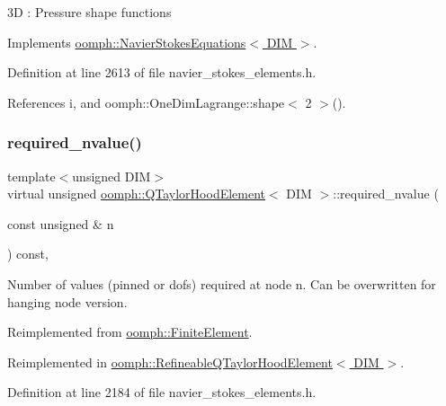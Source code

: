 3D \+: Pressure shape functions 

Implements \hyperlink{classoomph_1_1NavierStokesEquations_a487030303b71da299aed3d4639a022ab}{oomph\+::\+Navier\+Stokes\+Equations$<$ D\+I\+M $>$}.



Definition at line 2613 of file navier\+\_\+stokes\+\_\+elements.\+h.



References i, and oomph\+::\+One\+Dim\+Lagrange\+::shape$<$ 2 $>$().

\mbox{\label{classoomph_1_1QTaylorHoodElement_a7993924abd5095ebaa776ee0e080e600}} 
\subsubsection{\texorpdfstring{required\+\_\+nvalue()}{required\_nvalue()}}
{\footnotesize\ttfamily template$<$unsigned D\+IM$>$ \\
virtual unsigned \hyperlink{classoomph_1_1QTaylorHoodElement}{oomph\+::\+Q\+Taylor\+Hood\+Element}$<$ D\+IM $>$\+::required\+\_\+nvalue (\begin{DoxyParamCaption}\item[{const unsigned \&}]{n }\end{DoxyParamCaption}) const\hspace{0.3cm}{\ttfamily [inline]}, {\ttfamily [virtual]}}



Number of values (pinned or dofs) required at node n. Can be overwritten for hanging node version. 



Reimplemented from \hyperlink{classoomph_1_1FiniteElement_a56610c60d5bc2d7c27407a1455471b1a}{oomph\+::\+Finite\+Element}.



Reimplemented in \hyperlink{classoomph_1_1RefineableQTaylorHoodElement_a4b6f46aea58a70a24f9c356074a0ad95}{oomph\+::\+Refineable\+Q\+Taylor\+Hood\+Element$<$ D\+I\+M $>$}.



Definition at line 2184 of file navier\+\_\+stokes\+\_\+elements.\+h.



